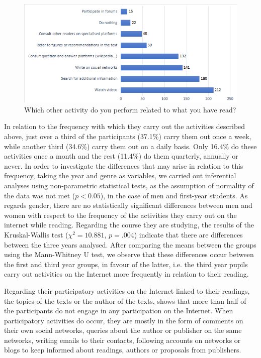 \documentclass[english]{textolivre}
\begin{document}
\begin{figure}[htbp]
\centering
\begin{minipage}{.85\textwidth}
 \includegraphics[width=\textwidth]{Imagem5.png}
 \caption{Which other activity do you perform related to what you have read?}
 \label{fig05}
\end{minipage}
\end{figure}

In relation to the frequency with which they carry out the activities described above, just over a third of the participants (37.1\%) carry them out once a week, while another third (34.6\%) carry them out on a daily basis. Only 16.4\% do these activities once a month and the rest (11.4\%) do them quarterly, annually or never. In order to investigate the differences that may arise in relation to this frequency, taking the year and genre as variables, we carried out inferential analyses using non-parametric statistical tests, as the assumption of normality of the data was not met ($p<0.05$), in the case of men and first-year students. As regards gender, there are no statistically significant differences between men and women with respect to the frequency of the activities they carry out on the internet while reading. Regarding the course they are studying, the results of the Kruskal-Wallis test ($\chi^2=10.881$, $p=.004$) indicate that there are differences between the three years analysed. After comparing the means between the groups using the Mann-Whitney U test, we observe that these differences occur between the first and third year groups, in favour of the latter, i.e. the third year pupils carry out activities on the Internet more frequently in relation to their reading.

Regarding their participatory activities on the Internet linked to their readings, the topics of the texts or the author of the texts,  shows that more than half of the participants do not engage in any participation on the Internet. When participatory activities do occur, they are mostly in the form of comments on their own social networks, queries about the author or publisher on the same networks, writing emails to their contacts, following accounts on networks or blogs to keep informed about readings, authors or proposals from publishers.
\end{document}
